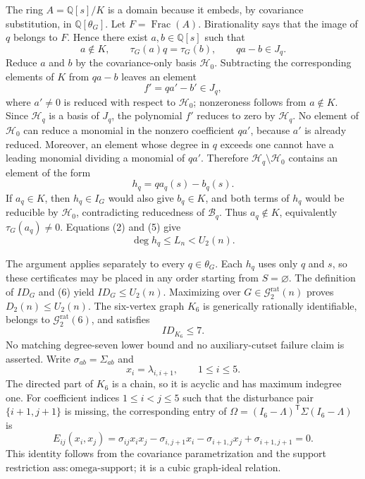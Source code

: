 The ring \(A=\mathbb Q[s]/K\) is a domain because it embeds, by covariance substitution, in \(\mathbb Q[\theta_G]\).  Let \(F=\operatorname{Frac}(A)\).  Birationality says that the image of \(q\) belongs to \(F\).  Hence there exist \(a,b\in\mathbb Q[s]\) such that
\[
 a\notin K,\qquad \tau_G(a)q=\tau_G(b),\qquad qa-b\in J_q. \tag{3}
\]
Reduce \(a\) and \(b\) by the covariance-only basis \(\mathcal H_0\).  Subtracting the corresponding elements of \(K\) from \(qa-b\) leaves an element
\[
 f'=q a'-b'\in J_q, \tag{4}
\]
where \(a'\neq0\) is reduced with respect to \(\mathcal H_0\); nonzeroness follows from \(a\notin K\).  Since \(\mathcal H_q\) is a basis of \(J_q\), the polynomial \(f'\) reduces to zero by \(\mathcal H_q\).  No element of \(\mathcal H_0\) can reduce a monomial in the nonzero coefficient \(q a'\), because \(a'\) is already reduced.  Moreover, an element whose degree in \(q\) exceeds one cannot have a leading monomial dividing a monomial of \(q a'\).  Therefore \(\mathcal H_q\setminus\mathcal H_0\) contains an element of the form
\[
 h_q=q a_q(s)-b_q(s). \tag{5}
\]
If \(a_q\in K\), then \(h_q\in I_G\) would also give \(b_q\in K\), and both terms of \(h_q\) would be reducible by \(\mathcal H_0\), contradicting reducedness of \(\mathcal B_q\).  Thus \(a_q\notin K\), equivalently \(\tau_G(a_q)\neq0\).  Equations (2) and (5) give
\[
 \deg h_q\leq L_n<U_2(n). \tag{6}
\]

The argument applies separately to every \(q\in\theta_G\).  Each \(h_q\) uses only \(q\) and \(s\), so these certificates may be placed in any order starting from \(S=\varnothing\).  The definition of \(ID_G\) and (6) yield \(ID_G\leq U_2(n)\).  Maximizing over \(G\in\mathcal G_{2}^{\mathrm{rat}}(n)\) proves \(D_2(n)\leq U_2(n)\).
The six-vertex graph \(K_6\) is generically rationally identifiable, belongs to \(\mathcal G_{2}^{\mathrm{rat}}(6)\), and satisfies
\[
 ID_{K_6}\leq7.
\]
No matching degree-seven lower bound and no auxiliary-cutset failure claim is asserted.
Write \(\sigma_{ab}=\Sigma_{ab}\) and
\[
 x_i=\lambda_{i,i+1},\qquad 1\leq i\leq5.
\]
The directed part of \(K_6\) is a chain, so it is acyclic and has maximum indegree one.  For coefficient indices \(1\leq i<j\leq5\) such that the disturbance pair \(\{i+1,j+1\}\) is missing, the corresponding entry of
\(\Omega=(I_6-\Lambda)^{\mathsf T}\Sigma(I_6-\Lambda)\) is
\[
 E_{ij}(x_i,x_j)
 =\sigma_{ij}x_ix_j-\sigma_{i,j+1}x_i-\sigma_{i+1,j}x_j+\sigma_{i+1,j+1}=0. \tag{7}
\]
This identity follows from the covariance parametrization and the support restriction \(\mathrm{ass:omega\mbox{-}support}\); it is a cubic graph-ideal relation.


